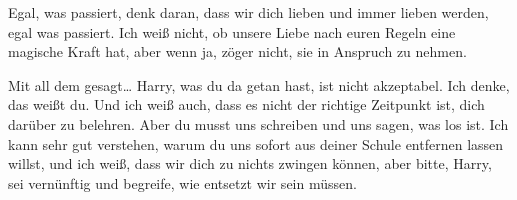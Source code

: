 \begin{writtenNote}
Egal, was passiert, denk daran, dass wir dich lieben und immer lieben werden, egal was passiert. Ich weiß nicht, ob unsere Liebe nach euren Regeln eine magische Kraft hat, aber wenn ja, zöger nicht, sie in Anspruch zu nehmen.

Mit all dem gesagt… Harry, was du da getan hast, ist nicht akzeptabel. Ich denke, das weißt du. Und ich weiß auch, dass es nicht der richtige Zeitpunkt ist, dich darüber zu belehren. Aber du musst uns schreiben und uns sagen, was los ist. Ich kann sehr gut verstehen, warum du uns sofort aus deiner Schule entfernen lassen willst, und ich weiß, dass wir dich zu nichts zwingen können, aber bitte, Harry, sei vernünftig und begreife, wie entsetzt wir sein müssen.


\end{writtenNote}
